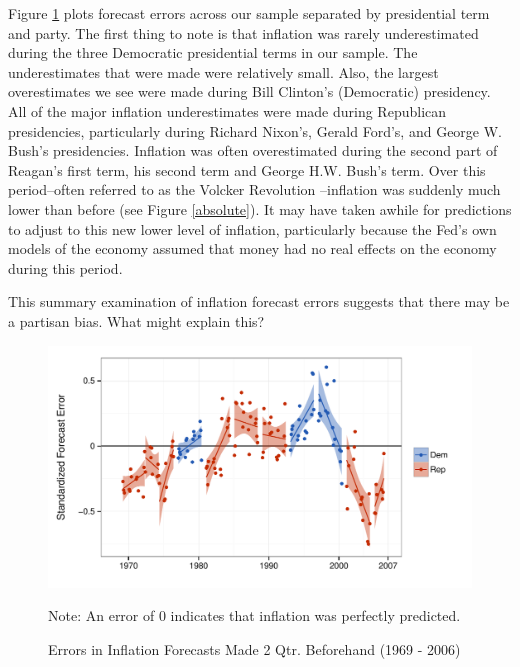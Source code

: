 \documentclass[a4paper]{article}\usepackage{graphicx, color}
\newenvironment{knitrout}{}{} %
\begin{document}
Figure \ref{errors_over_time} plots forecast errors across our sample separated by presidential term and party. The first thing to note is that inflation was rarely underestimated during the three Democratic presidential terms in our sample. The underestimates that were made were relatively small. Also, the largest overestimates we see were made during Bill Clinton's (Democratic) presidency. All of the major inflation underestimates were made during Republican presidencies, particularly during Richard Nixon's, Gerald Ford's, and George W. Bush's presidencies. Inflation was often overestimated during the second part of Reagan's first term, his second term and George H.W. Bush's term. Over this period--often referred to as the Volcker Revolution \citep[see][]{Bartels1985}--inflation was suddenly much lower than before (see Figure \ref{absolute}). It may have taken awhile for predictions to adjust to this new lower level of inflation, particularly because the Fed's own models of the economy assumed that money had no real effects on the economy during this period.

This summary examination of inflation forecast errors suggests that there may be a partisan bias. What might explain this?

\begin{figure}[t]
    \caption{Errors in Inflation Forecasts Made 2 Qtr. Beforehand (1969 - 2006)}
    \label{errors_over_time}
    \begin{center}
    
\begin{knitrout}
\color{fgcolor}

{\centering \includegraphics[width=0.8\linewidth]{figure/PartisanError} 

}



\end{knitrout}

    
    \end{center}
    \begin{singlespace}
        {\scriptsize{Note: An error of 0 indicates that inflation was perfectly predicted.}}
    \end{singlespace}
\end{figure}
\end{document}
